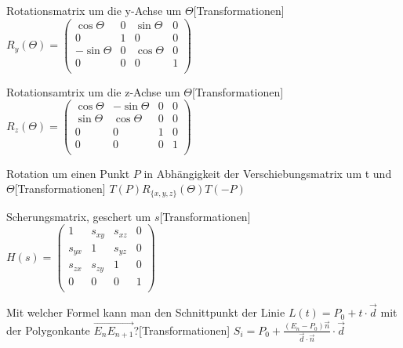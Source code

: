 \documentclass[a7paper,print]{kartei}
\begin{document}
\begin{karte}[CGIS]{Rotationsmatrix um die y-Achse um $\Theta$}[Transformationen]
$ R_y(\Theta) = \left( \begin{array}{cccc}
\cos \Theta & 0 & \sin \Theta & 0 \\
0 & 1 & 0 & 0 \\
-\sin\Theta & 0 & \cos \Theta & 0 \\
0 & 0 & 0 & 1 \\
\end{array}
\right)
$
\end{karte}

\begin{karte}[CGIS]{Rotationsamtrix um die z-Achse um $\Theta$}[Transformationen]
$ R_z(\Theta) = \left( \begin{array}{cccc}
\cos\Theta & -\sin\Theta & 0 & 0 \\
\sin\Theta & \cos\Theta & 0 & 0 \\
0 & 0 & 1 & 0 \\
0 & 0 & 0 & 1 \\
\end{array}
\right)
$
\end{karte}

\begin{karte}[CGIS]{Rotation um einen Punkt $P$ in Abhängigkeit der Verschiebungsmatrix um t und $\Theta$}[Transformationen]
$T(P) R_{\{x,y,z\}}(\Theta) T(-P)$
\end{karte}

\begin{karte}[CGIS]{Scherungsmatrix, geschert um $s$}[Transformationen]
$ H(s) = \left( \begin{array}{cccc}
1 & s_{xy} & s_{xz} & 0 \\
s_{yx} & 1 & s_{yz} & 0 \\
s_{zx} & s_{zy} & 1 & 0 \\
0 & 0 & 0 & 1 \\
\end{array}
\right)
$
\end{karte}

\begin{karte}[CGIS]{Mit welcher Formel kann man den Schnittpunkt der Linie $L(t)=P_0 + t \cdot \overrightarrow{d}$ mit der Polygonkante $\overrightarrow{E_n E_{n+1}}$?}[Transformationen]
$S_i = P_0 + \frac{(E_n - P_0) \overrightarrow{n}}{\overrightarrow{d} \cdot \overrightarrow{n}} \cdot \overrightarrow{d}$
\end{karte}
\end{document}
